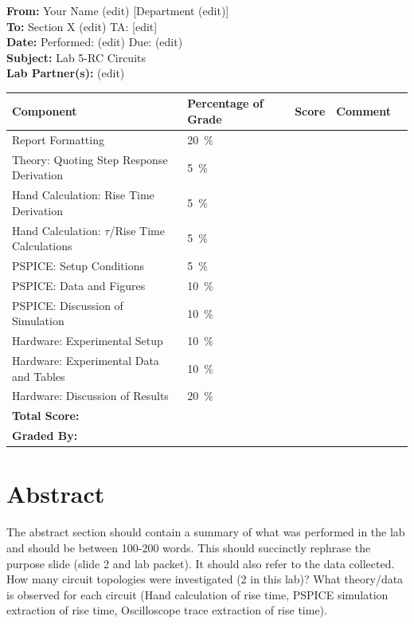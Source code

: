 \documentclass[11pt]{article}
\begin{document}
\Large
\textbf{From:} Your Name (edit) [Department (edit)] \\
\textbf{To: } Section X (edit) TA: [edit] \\
\textbf{Date: } Performed: (edit)  Due: (edit) \\
\textbf{Subject: } Lab 5-RC Circuits\\
\textbf{Lab Partner(s): } (edit)\\
\vspace{0.5in}
	\begin{table}[h!]
		\centering
		\begin{tabular}{|l||l|l|l|l|}
			\hline
			Component & Percentage of Grade   & Score \hspace{0.5in} & Comment \hspace{0.75in}  \\
			\hline
			Report Formatting & 20~\si{\percent} & & \\	 
			\hline
			\hline 
			Theory: Quoting Step Response Derivation & 5~\si{\percent} & & \\	 
			 \hline
		    Hand Calculation: Rise Time Derivation & 5~\si{\percent} & & \\	 
		    \hline
		     Hand Calculation: $\tau$/Rise Time Calculations & 5~\si{\percent} & & \\
			 \hline
			PSPICE: Setup Conditions & 5~\si{\percent} & & \\	 
			 \hline
			PSPICE: Data and Figures & 10~\si{\percent} & & \\	 
			 \hline
			PSPICE: Discussion of Simulation & 10~\si{\percent} & & \\	 
			\hline
			\hline
			Hardware: Experimental Setup & 10~\si{\percent} & & \\	 
			\hline
			Hardware: Experimental Data and Tables & 10~\si{\percent} & & \\	 
			\hline
			Hardware: Discussion of Results & 20~\si{\percent} & & \\	 
			\hline
			\textbf{Total Score:}&  & & \\	 
			\hline
			\textbf{Graded By:}&  & & \\	 
			\hline
		\end{tabular}
	\end{table}
\newpage
\section*{Abstract}
\normalsize
The abstract section should contain a summary of what was performed in the lab and should be between 100-200 words.  This should succinctly rephrase the purpose slide (slide 2 and lab packet).  It should also refer to the data collected.   How many circuit topologies were  investigated (2 in this lab)?  What theory/data is observed for each circuit (Hand calculation of rise time, PSPICE simulation extraction of rise time, Oscilloscope trace extraction of rise time). 
\end{document}
